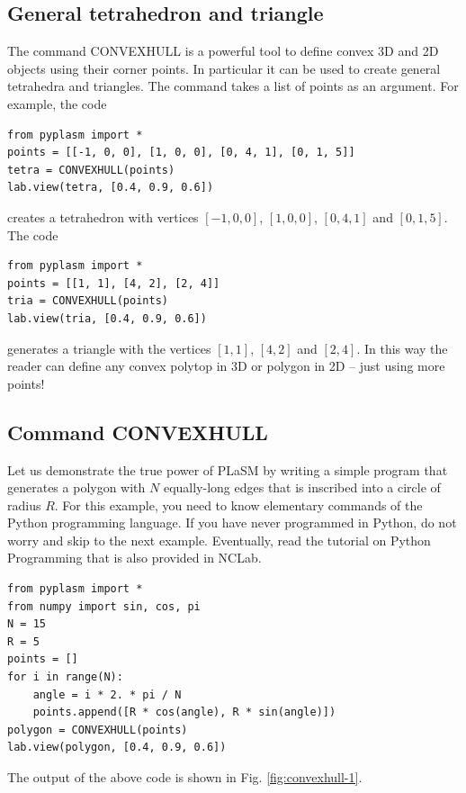 \documentclass[article,A4,12pt]{llncs}
\begin{document}
\subsection{General tetrahedron and triangle}

The command CONVEXHULL is a powerful tool to define convex 3D and 2D objects using 
their corner points. In particular it can be used to create general tetrahedra and 
triangles. The command takes a list of points as an argument. For example, the code

\begin{verbatim}
from pyplasm import *
points = [[-1, 0, 0], [1, 0, 0], [0, 4, 1], [0, 1, 5]]
tetra = CONVEXHULL(points)
lab.view(tetra, [0.4, 0.9, 0.6])
\end{verbatim}
creates a tetrahedron with vertices $[-1, 0, 0]$, $[1, 0, 0]$, $[0, 4, 1]$ and $[0, 1, 5]$.
The code

\begin{verbatim}
from pyplasm import *
points = [[1, 1], [4, 2], [2, 4]]
tria = CONVEXHULL(points)
lab.view(tria, [0.4, 0.9, 0.6])
\end{verbatim}
generates a triangle with the vertices $[1, 1]$, $[4, 2]$ and $[2, 4]$. In this way 
the reader can define any convex polytop in 3D or polygon in 2D -- just using more 
points!

\subsection{Command CONVEXHULL}

Let us demonstrate the true power of PLaSM by writing a simple program that generates 
a polygon with $N$ equally-long edges that is inscribed into a circle of radius $R$.
For this example, you need to know elementary commands of the Python programming 
language. If you have never programmed in Python, do not worry and skip to the next 
example. Eventually, read the tutorial on Python Programming that is also provided
in NCLab.

\begin{verbatim}
from pyplasm import *
from numpy import sin, cos, pi
N = 15
R = 5
points = []
for i in range(N):
    angle = i * 2. * pi / N
    points.append([R * cos(angle), R * sin(angle)])
polygon = CONVEXHULL(points)
lab.view(polygon, [0.4, 0.9, 0.6])
\end{verbatim}
The output of the above code is shown in Fig. \ref{fig:convexhull-1}.
\end{document}
